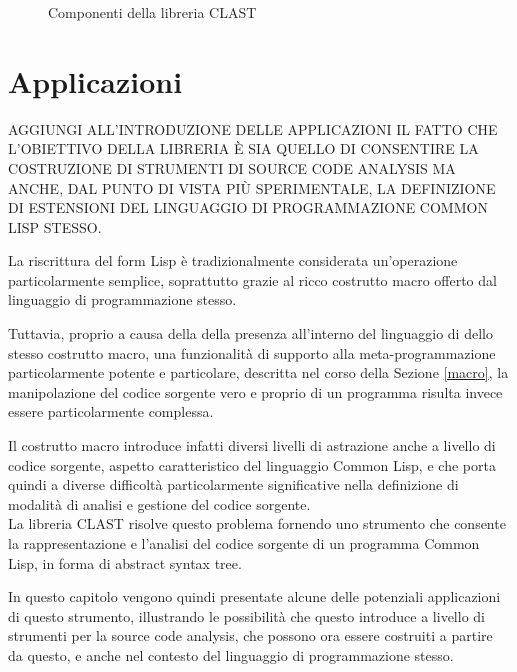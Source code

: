 \documentclass{book}
\newcommand{\image}[4]{
  \begin{figure}[H]
  \makebox[\textwidth][c]{
    \texttt{[image: \#1]}
  }
  \caption{#2}
  \label{#3}
  \end{figure}
}
\begin{document}
\image{img/clast-architecture.png}
      {Componenti della libreria CLAST}
      {fig:clast-architecture}
      {0.5}





\endgroup

\chapter{Applicazioni}
\label{applications}

AGGIUNGI ALL’INTRODUZIONE DELLE APPLICAZIONI IL FATTO CHE L’OBIETTIVO DELLA
LIBRERIA È SIA QUELLO DI CONSENTIRE LA COSTRUZIONE DI STRUMENTI DI SOURCE CODE
ANALYSIS MA ANCHE, DAL PUNTO DI VISTA PIÙ SPERIMENTALE, LA DEFINIZIONE DI
ESTENSIONI DEL LINGUAGGIO DI PROGRAMMAZIONE COMMON LISP STESSO.

La riscrittura del form Lisp è tradizionalmente considerata un'operazione
particolarmente semplice, soprattutto grazie al ricco costrutto macro offerto
dal linguaggio di programmazione stesso.

Tuttavia, proprio a causa della della presenza all'interno del linguaggio di
dello stesso costrutto macro, una funzionalità di supporto alla
meta-programmazione particolarmente potente e particolare, descritta nel corso
della Sezione \ref{macro}, la manipolazione del codice sorgente vero e proprio
di un programma risulta invece essere particolarmente complessa.

Il costrutto macro introduce infatti diversi livelli di astrazione anche a
livello di codice sorgente, aspetto caratteristico del linguaggio Common Lisp, e
che porta quindi a diverse difficoltà particolarmente significative nella
definizione di modalità di analisi e gestione del codice sorgente.\\


La libreria CLAST risolve questo problema fornendo uno strumento che consente la
rappresentazione e l'analisi del codice sorgente di un programma Common Lisp, in
forma di abstract syntax tree.

In questo capitolo vengono quindi presentate alcune delle potenziali
applicazioni di questo strumento, illustrando le possibilità che questo
introduce a livello di strumenti per la source code analysis, che possono ora
essere costruiti a partire da questo, e anche nel contesto del linguaggio di
programmazione stesso.
\end{document}
